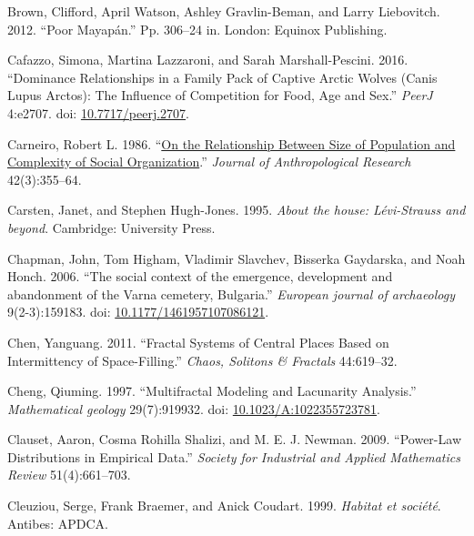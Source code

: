 \documentclass[
  12pt,
]{book}
\newlength{\cslhangindent}
\newlength{\cslentryspacingunit} %
\newenvironment{CSLReferences}[2] %
 {%
  \setlength{\parindent}{0pt}
  \ifodd #1
  \let\oldpar\par
  \def\par{\hangindent=\cslhangindent\oldpar}
  \fi
  \setlength{\parskip}{#2\cslentryspacingunit}
 }%
 {}
\begin{document}
\begin{CSLReferences}{1}{0}
\leavevmode{}%
Brown, Clifford, April Watson, Ashley Gravlin-Beman, and Larry Liebovitch. 2012. {``Poor Mayapán.''} Pp. 306--24 in. London: Equinox Publishing.

\leavevmode{}%
Cafazzo, Simona, Martina Lazzaroni, and Sarah Marshall-Pescini. 2016. {``Dominance Relationships in a Family Pack of Captive Arctic Wolves (Canis Lupus Arctos): The Influence of Competition for Food, Age and Sex.''} \emph{PeerJ} 4:e2707. doi: \href{https://doi.org/10.7717/peerj.2707}{10.7717/peerj.2707}.

\leavevmode{}%
Carneiro, Robert L. 1986. {``\href{http://www.jstor.org/stable/3630039}{On the Relationship Between Size of Population and Complexity of Social Organization}.''} \emph{Journal of Anthropological Research} 42(3):355--64.

\leavevmode{}%
Carsten, Janet, and Stephen Hugh-Jones. 1995. \emph{About the house: Lévi-Strauss and beyond}. Cambridge: University Press.

\leavevmode{}%
Chapman, John, Tom Higham, Vladimir Slavchev, Bisserka Gaydarska, and Noah Honch. 2006. {``The social context of the emergence, development and abandonment of the Varna cemetery, Bulgaria.''} \emph{European journal of archaeology} 9(2-3):159183. doi: \href{https://doi.org/10.1177/1461957107086121}{10.1177/1461957107086121}.

\leavevmode{}%
Chen, Yanguang. 2011. {``Fractal Systems of Central Places Based on Intermittency of Space-Filling.''} \emph{Chaos, Solitons \& Fractals} 44:619--32.

\leavevmode{}%
Cheng, Qiuming. 1997. {``Multifractal Modeling and Lacunarity Analysis.''} \emph{Mathematical geology} 29(7):919932. doi: \href{https://doi.org/10.1023/A:1022355723781}{10.1023/A:1022355723781}.

\leavevmode{}%
Clauset, Aaron, Cosma Rohilla Shalizi, and M. E. J. Newman. 2009. {``Power-Law Distributions in Empirical Data.''} \emph{Society for Industrial and Applied Mathematics Review} 51(4):661--703.

\leavevmode{}%
Cleuziou, Serge, Frank Braemer, and Anick Coudart. 1999. \emph{Habitat et société}. Antibes: APDCA.


\end{CSLReferences}
\end{document}
